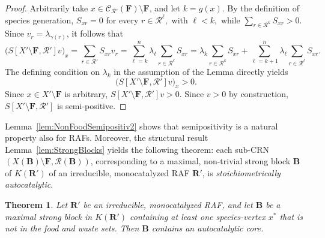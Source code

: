 \documentclass[pdflatex]{sn-jnl}
\theoremstyle{thmstyleone}%
\newtheorem{theorem}{Theorem}%
\theoremstyle{examplesty}%
\theoremstyle{thmstylethree}%
\newcommand{\king}{K}
\newcommand{\food}{\ensuremath{\mathbf{F}}}
\newcommand{\SM}{S}
\newcommand{\closure}[2]{\mathscr{C}_{#1}(#2)}
\newcommand{\CR}[0]{\mathcal{R}}
\newcommand{\RAF}[0]{\mathbf{R}'}
\newcommand{\block}[0]{\mathbf{B}}
\newcommand{\sgen}{g}
\newcommand{\PFS}[1]{\begingroup\color{cyan}#1\endgroup}
\begin{document}
\begin{proof}
  Arbitrarily take \(x\in \closure{\mathcal{R}'}{\food} \setminus\food\),
  and let \(k=\sgen(x)\). By the definition of species generation,
  $ \SM_{xr}=0$ for every $r\in\mathcal R^\ell,$ with $\ell<k,$ while
  $ \sum_{r\in\mathcal R^k}\SM_{xr}>0.$ Since \(v_r=\lambda_{\gamma(r)}\),
  it follows that
  \begin{equation*}
    \bigl(\SM[X'\setminus\food,\mathcal R']v\bigr)_x
    =
    \sum_{r\in\mathcal R'}\SM_{xr}v_r=
    \sum_{\ell=k}^{n}
    \lambda_\ell
    \sum_{r\in\mathcal R^\ell}\SM_{xr}
    =
    \lambda_k
    \sum_{r\in\mathcal R^k}\SM_{xr}
    +
    \sum_{\ell=k+1}^{n}
    \lambda_\ell
    \sum_{r\in\mathcal R^\ell}\SM_{xr}.
  \end{equation*}
  The defining condition on \(\lambda_k\) in the assumption of the Lemma
  directly yields
  \begin{equation*}
    \bigl(\SM[X'\setminus\food,\mathcal R']v\bigr)_x>0.
  \end{equation*}
  Since \(x\in X'\setminus\food\) is arbitrary,
  $\SM[X'\setminus\food,\mathcal R']v>0$. Since $v>0$ by construction,
  \(\SM[X'\setminus\food,\mathcal R']\) is semi-positive.
\end{proof}

Lemma~\ref{lem:NonFoodSemipositiv2} shows that semipositivity is a natural
property also for RAFs. Moreover, the structural result
Lemma~\ref{lem:StrongBlocks} yields the following theorem: each sub-CRN
$(X(\block)\setminus \food, \CR(\block))$, corresponding to a maximal,
non-trivial strong block $\block$ of $\king(\RAF)$ of an irreducible,
monocatalyzed RAF $\RAF$, is \emph{stoichiometrically autocatalytic}.

\vspace{6pt}
\begin{theorem}\label{Thm:StrBlockCore}
  Let $\RAF$ be an irreducible, monocatalyzed RAF, and let $\block$ be a
  maximal strong block \PFS{in} $\king(\RAF)$ containing \PFS{at least one}
  species-vertex $x^*$ that is not in the food and waste sets. Then
  $\block$ contains an autocatalytic core.
\end{theorem}
\vspace{6pt}
\end{document}
